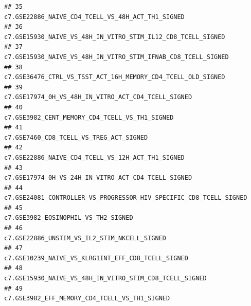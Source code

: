\documentclass{article}\usepackage[]{graphicx}\usepackage[]{color}
\makeatletter
\newenvironment{kframe}{%
 \def\at@end@of@kframe{}%
 \ifinner\ifhmode%
  \def\at@end@of@kframe{\end{minipage}}%
  \begin{minipage}{\columnwidth}%
 \fi\fi%
 \def\FrameCommand##1{\hskip\@totalleftmargin \hskip-\fboxsep
 \colorbox{shadecolor}{##1}\hskip-\fboxsep
     \hskip-\linewidth \hskip-\@totalleftmargin \hskip\columnwidth}%
 \MakeFramed {\advance\hsize-\width
   \@totalleftmargin\z@ \linewidth\hsize
   \@setminipage}}%
 {\par\unskip\endMakeFramed%
 \at@end@of@kframe}
\newenvironment{knitrout}{}{} %
\makeatother
\begin{document}
\begin{knitrout}
\begin{kframe}
\begin{verbatim}
## 35                                                                                                                                  c7.GSE22886_NAIVE_CD4_TCELL_VS_48H_ACT_TH1_SIGNED
## 36                                                                                                                       c7.GSE15930_NAIVE_VS_48H_IN_VITRO_STIM_IL12_CD8_TCELL_SIGNED
## 37                                                                                                                      c7.GSE15930_NAIVE_VS_48H_IN_VITRO_STIM_IFNAB_CD8_TCELL_SIGNED
## 38                                                                                                                       c7.GSE36476_CTRL_VS_TSST_ACT_16H_MEMORY_CD4_TCELL_OLD_SIGNED
## 39                                                                                                                                c7.GSE17974_0H_VS_48H_IN_VITRO_ACT_CD4_TCELL_SIGNED
## 40                                                                                                                                     c7.GSE3982_CENT_MEMORY_CD4_TCELL_VS_TH1_SIGNED
## 41                                                                                                                                            c7.GSE7460_CD8_TCELL_VS_TREG_ACT_SIGNED
## 42                                                                                                                                  c7.GSE22886_NAIVE_CD4_TCELL_VS_12H_ACT_TH1_SIGNED
## 43                                                                                                                                c7.GSE17974_0H_VS_24H_IN_VITRO_ACT_CD4_TCELL_SIGNED
## 44                                                                                                                 c7.GSE24081_CONTROLLER_VS_PROGRESSOR_HIV_SPECIFIC_CD8_TCELL_SIGNED
## 45                                                                                                                                                c7.GSE3982_EOSINOPHIL_VS_TH2_SIGNED
## 46                                                                                                                                       c7.GSE22886_UNSTIM_VS_IL2_STIM_NKCELL_SIGNED
## 47                                                                                                                                 c7.GSE10239_NAIVE_VS_KLRG1INT_EFF_CD8_TCELL_SIGNED
## 48                                                                                                                            c7.GSE15930_NAIVE_VS_48H_IN_VITRO_STIM_CD8_TCELL_SIGNED
## 49                                                                                                                                      c7.GSE3982_EFF_MEMORY_CD4_TCELL_VS_TH1_SIGNED

\end{verbatim}
\end{kframe}
\end{knitrout}
\end{document}
